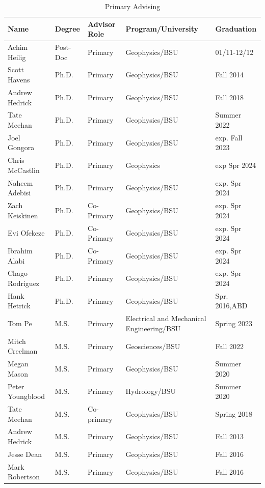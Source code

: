 \documentclass[11pt]{article}
\renewcommand\arraystretch{1}
\begin{document}
\begin{table}[!htbp]
\caption*{Primary Advising}
\small
\renewcommand\arraystretch{0.7}
  \centering
  \begin{tabular}{|l|l|l|l|l|}
\hline
\textbf{Name} & \textbf{Degree} & \textbf{Advisor Role} & \textbf{Program/University} & \textbf{Graduation} \\ \hline \hline
Achim Heilig & Post-Doc & Primary & Geophysics/BSU & 01/11-12/12 \\ \hline
Scott Havens & Ph.D. & Primary & Geophysics/BSU & Fall 2014 \\ \hline
Andrew Hedrick & Ph.D. & Primary & Geophysics/BSU & Fall 2018 \\ \hline
Tate Meehan & Ph.D. & Primary & Geophysics/BSU & Summer 2022 \\ \hline
Joel Gongora & Ph.D. & Primary & Geophysics/BSU & exp. Fall 2023 \\ \hline
Chris McCastlin & Ph.D. & Primary & Geophysics & exp Spr 2024 \\ \hline
Naheem Adebisi & Ph.D. & Primary & Geophysics/BSU & exp. Spr 2024  \\ \hline
Zach Keiskinen & Ph.D. & Co-Primary & Geophysics/BSU & exp. Spr 2024  \\ \hline
Evi Ofekeze & Ph.D. & Co-Primary & Geophysics/BSU & exp. Spr 2024  \\ \hline
Ibrahim Alabi & Ph.D. & Co-Primary & Geophysics/BSU & exp. Spr 2024  \\ \hline
Chago Rodriguez & Ph.D. & Primary & Geophysics/BSU & exp. Spr 2024 \\ \hline
Hank Hetrick & Ph.D. & Primary & Geophysics/BSU & Spr. 2016,ABD \\ \hline
Tom Pe & M.S. & Primary & Electrical and Mechanical Engineering/BSU & Spring 2023 \\ \hline
Mitch Creelman & M.S. & Primary & Geosciences/BSU & Fall 2022 \\ \hline
Megan Mason & M.S. & Primary & Geophysics/BSU & Summer 2020 \\ \hline
Peter Youngblood & M.S. & Primary & Hydrology/BSU & Summer 2020 \\ \hline
Tate Meehan & M.S. & Co-primary & Geophysics/BSU & Spring 2018 \\ \hline
Andrew Hedrick & M.S. & Primary & Geophysics/BSU & Fall 2013 \\ \hline
Jesse Dean & M.S. & Primary & Geophysics/BSU & Fall 2016 \\ \hline
Mark Robertson & M.S. & Primary & Geophysics/BSU & Fall 2016 \\ \hline

\end{tabular}
\end{table}
\end{document}
